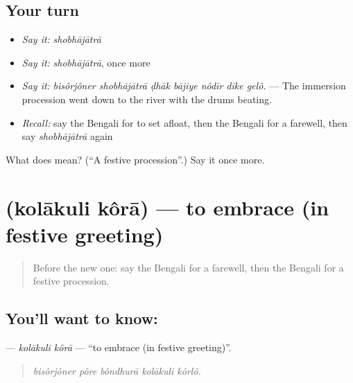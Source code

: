 \subsection*{Your turn}
\begin{itemize}
\raggedright
  \item \emph{Say it:} \emph{shobhājātrā}
  \item \emph{Say it:} \emph{shobhājātrā}, once more
  \item \emph{Say it:} \emph{bisôrjôner shobhājātrā ḍhāk bājiye nôdīr dike gelô.} — The immersion procession went down to the river with the drums beating.
  \item \emph{Recall:} say the Bengali for to set afloat, then the Bengali for a farewell, then say \emph{shobhājātrā} again
\end{itemize}

\begin{tcolorbox}[breakable,colback=teal!4,colframe=teal!35!black,title={Before you move on}]
What does  mean? (\textquotedblleft{}A festive procession\textquotedblright{}.) Say it once more.
\end{tcolorbox}
\section[\texorpdfstring{\bn{কোলাকুলি} \bn{করা} (kolākuli kôrā)}{কোলাকুলি করা (kolākuli kôrā)}]{  (kolākuli kôrā) — to embrace (in festive greeting)}

\label{lesson:BN-C308-kolakuli-kora}



\begin{quote}
Before the new one: say the Bengali for a farewell, then the Bengali for a festive procession.
\end{quote}

\subsection*{You'll want to know:  }
\textbf{ } — \emph{kolākuli kôrā} — \textquotedblleft{}to embrace (in festive greeting)\textquotedblright{}.

\begin{quote}
    
\end{quote}

\begin{quote}
\emph{bisôrjôner pôre bôndhurā kolākuli kôrlô.}
\end{quote}

